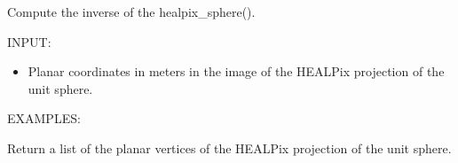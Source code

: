 \documentclass[a4paper,12ptopenany,oneside,english]{sphinxmanual}
\begin{document}
\begin{fulllineitems}
\label{\detokenize{pj_healpix:rhealpixdggs.pj_healpix.healpix_sphere_inverse}}
\pysigstartsignatures
{}
\pysigstopsignatures
\sphinxAtStartPar
Compute the inverse of the healpix\_sphere().

\sphinxAtStartPar
INPUT:
\begin{itemize}
\item {} 
\sphinxAtStartPar
{} \sphinxhyphen{} Planar coordinates in meters in the image of the
HEALPix projection of the unit sphere.

\end{itemize}

\sphinxAtStartPar
EXAMPLES:

\begin{sphinxVerbatim}[commandchars=\\\{\}]
    
\end{sphinxVerbatim}

\end{fulllineitems}


\begin{fulllineitems}
\label{\detokenize{pj_healpix:rhealpixdggs.pj_healpix.healpix_vertices}}
\pysigstartsignatures
{}
\pysigstopsignatures
\sphinxAtStartPar
Return a list of the planar vertices of the HEALPix projection of
the unit sphere.

\end{fulllineitems}

\end{document}
